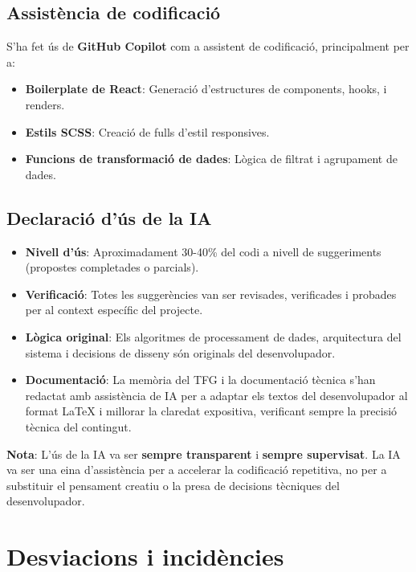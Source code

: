 \subsection{Assistència de codificació}

S'ha fet ús de \textbf{GitHub Copilot} com a assistent de codificació, principalment per a:

\begin{itemize}
    \item \textbf{Boilerplate de React}: Generació d'estructures de components, hooks, i renders.
    \item \textbf{Estils SCSS}: Creació de fulls d'estil responsives.
    \item \textbf{Funcions de transformació de dades}: Lògica de filtrat i agrupament de dades.
\end{itemize}

\subsection{Declaració d'ús de la IA}

\begin{itemize}
    \item \textbf{Nivell d'ús}: Aproximadament 30-40\% del codi a nivell de suggeriments (propostes completades o parcials).
    \item \textbf{Verificació}: Totes les suggerències van ser revisades, verificades i probades per al context específic del projecte.
    \item \textbf{Lògica original}: Els algoritmes de processament de dades, arquitectura del sistema i decisions de disseny són originals del desenvolupador.
    \item \textbf{Documentació}: La memòria del TFG i la documentació tècnica s'han redactat amb assistència de IA per a adaptar els textos del desenvolupador al format LaTeX i millorar la claredat expositiva, verificant sempre la precisió tècnica del contingut.
\end{itemize}

\textbf{Nota}: L'ús de la IA va ser \textbf{sempre transparent} i \textbf{sempre supervisat}. La IA va ser una eina d'assistència per a accelerar la codificació repetitiva, no per a substituir el pensament creatiu o la presa de decisions tècniques del desenvolupador.


\section{Desviacions i incidències}

